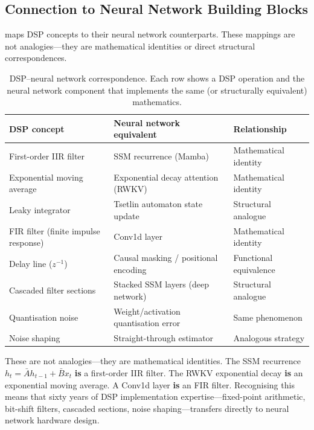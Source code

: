 \subsection{Connection to Neural Network Building Blocks}
\label{sec:dsp-nn-connection}

 maps DSP concepts to their neural network
counterparts. These mappings are not analogies---they are mathematical
identities or direct structural correspondences.

\begin{table}[htbp]
\centering
\caption{DSP--neural network correspondence. Each row shows a DSP
  operation and the neural network component that implements the same
  (or structurally equivalent) mathematics.}
\label{tab:dsp-nn-mapping}
\begin{tabularx}{\textwidth}{@{}l >{\raggedright\arraybackslash}X
  >{\raggedright\arraybackslash}X@{}}
  \toprule
  \textbf{DSP concept}
    & \textbf{Neural network equivalent}
    & \textbf{Relationship} \\
  \midrule
  First-order IIR filter
    & SSM recurrence (Mamba)
    & Mathematical identity \\
  Exponential moving average
    & Exponential decay attention (RWKV)
    & Mathematical identity \\
  Leaky integrator
    & Tsetlin automaton state update
    & Structural analogue \\
  FIR filter (finite impulse response)
    & Conv1d layer
    & Mathematical identity \\
  Delay line ($z^{-1}$)
    & Causal masking / positional encoding
    & Functional equivalence \\
  Cascaded filter sections
    & Stacked SSM layers (deep network)
    & Structural analogue \\
  Quantisation noise
    & Weight/activation quantisation error
    & Same phenomenon \\
  Noise shaping
    & Straight-through estimator
    & Analogous strategy \\
  \bottomrule
\end{tabularx}
\end{table}

\begin{keyinsight}
These are not analogies---they are mathematical identities. The SSM
recurrence $h_t = \bar{A} h_{t-1} + \bar{B} x_t$ \textbf{is} a
first-order IIR filter. The RWKV exponential decay \textbf{is} an
exponential moving average. A Conv1d layer \textbf{is} an FIR filter.
Recognising this means that sixty years of DSP implementation
expertise---fixed-point arithmetic, bit-shift filters, cascaded
sections, noise shaping---transfers directly to neural network
hardware design.
\end{keyinsight}

